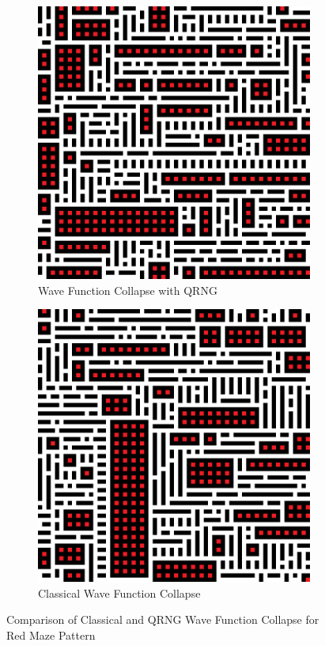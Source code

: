 \documentclass[10pt]{article}
\begin{document}
\newpage
\null
\vfill
\begin{figure}[h]
\centering
\begin{subfigure}{.5\textwidth}
  \centering
  \includegraphics[scale=0.22]{redResultQRNG}
  \caption{Wave Function Collapse with QRNG}
  \label{fig:redqrng}
\end{subfigure}%
\begin{subfigure}{.5\textwidth}
  \centering
  \includegraphics[scale=0.22]{redResultClassical}
  \caption{Classical Wave Function Collapse}
  \label{fig:redclass}
\end{subfigure}
\caption{Comparison of Classical and QRNG Wave Function Collapse for Red Maze Pattern}
\label{fig:redcompare}
\end{figure}
\end{document}
